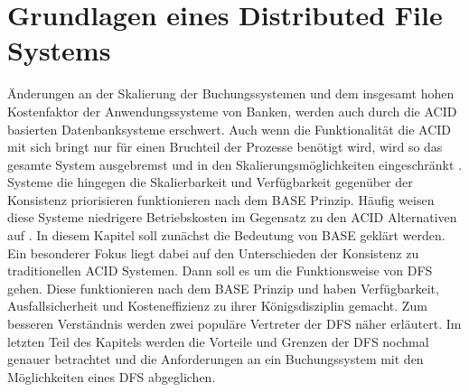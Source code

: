 \documentclass[12pt,oneside,a4paper,parskip]{scrbook}
\begin{document}
\chapter{Grundlagen eines Distributed File Systems}
Änderungen an der Skalierung der Buchungssystemen und dem insgesamt hohen Kostenfaktor der Anwendungssysteme von Banken, werden auch durch die ACID basierten Datenbanksysteme erschwert. Auch wenn die Funktionalität die ACID mit sich bringt nur für einen Bruchteil der Prozesse benötigt wird, wird so das gesamte System ausgebremst und in den Skalierungsmöglichkeiten eingeschränkt \cite{salt}.
Systeme die hingegen die Skalierbarkeit und Verfügbarkeit gegenüber der Konsistenz priorisieren funktionieren nach dem BASE Prinzip. Häufig weisen diese Systeme niedrigere Betriebskosten im Gegensatz zu den ACID Alternativen auf \cite{clusterBASE}.
In diesem Kapitel soll zunächst die Bedeutung von BASE geklärt werden. Ein besonderer Fokus liegt dabei auf den Unterschieden der Konsistenz zu traditionellen ACID Systemen. Dann soll es um die Funktionsweise von DFS gehen. Diese funktionieren nach dem BASE Prinzip und haben Verfügbarkeit, Ausfallsicherheit und Kosteneffizienz zu ihrer Königsdisziplin gemacht. Zum besseren Verständnis werden zwei populäre Vertreter der DFS näher erläutert. Im letzten Teil des Kapitels werden die Vorteile und Grenzen der DFS nochmal genauer betrachtet und die Anforderungen an ein Buchungssystem mit den Möglichkeiten eines DFS abgeglichen.
\end{document}
